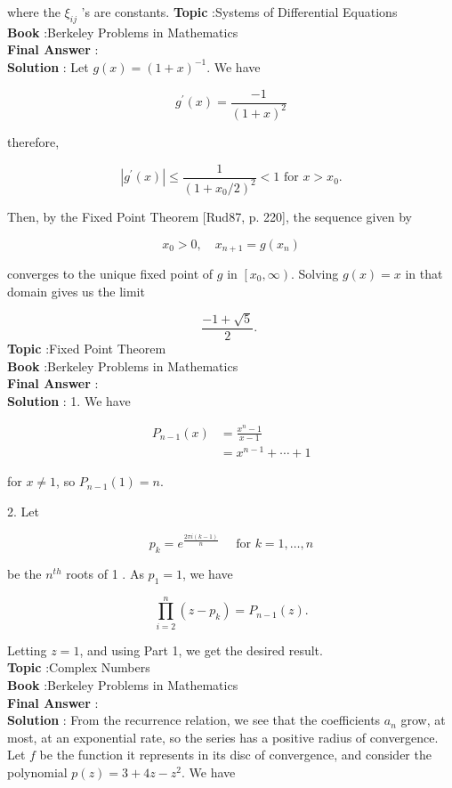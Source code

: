 \documentclass[10pt]{article}
\begin{document}
where the $\xi_{i j}$ 's are constants.
\textbf{Topic} :Systems of Differential Equations \\
\textbf{Book} :Berkeley Problems in Mathematics\\
\textbf{Final Answer} :\\


\textbf{Solution} : Let $g(x)=(1+x)^{-1}$. We have

$$
g^{\prime}(x)=\frac{-1}{(1+x)^{2}}
$$

therefore,

$$
\left|g^{\prime}(x)\right| \leqslant \frac{1}{\left(1+x_{0} / 2\right)^{2}}<1 \text { for } x>x_{0} .
$$

Then, by the Fixed Point Theorem [Rud87, p. 220], the sequence given by

$$
x_{0}>0, \quad x_{n+1}=g\left(x_{n}\right)
$$

converges to the unique fixed point of $g$ in $\left[x_{0}, \infty\right)$. Solving $g(x)=x$ in that domain gives us the limit

$$
\frac{-1+\sqrt{5}}{2} \text {. }
$$
\textbf{Topic} :Fixed Point Theorem \\
\textbf{Book} :Berkeley Problems in Mathematics\\
\textbf{Final Answer} :\\


\textbf{Solution} : 1. We have

$$
\begin{aligned}
P_{n-1}(x) &=\frac{x^{n}-1}{x-1} \\
&=x^{n-1}+\cdots+1
\end{aligned}
$$

for $x \neq 1$, so $P_{n-1}(1)=n$.

2. Let

$$
p_{k}=e^{\frac{2 \pi i(k-1)}{n}} \quad \text { for } k=1, \ldots, n
$$

be the $n^{t h}$ roots of 1 . As $p_{1}=1$, we have

$$
\prod_{i=2}^{n}\left(z-p_{k}\right)=P_{n-1}(z) .
$$

Letting $z=1$, and using Part 1, we get the desired result. \\
\textbf{Topic} :Complex Numbers \\
\textbf{Book} :Berkeley Problems in Mathematics\\
\textbf{Final Answer} :\\


\textbf{Solution} : From the recurrence relation, we see that the coefficients $a_{n}$ grow, at most, at an exponential rate, so the series has a positive radius of convergence. Let $f$ be the function it represents in its disc of convergence, and consider the polynomial $p(z)=3+4 z-z^{2}$. We have
\end{document}

